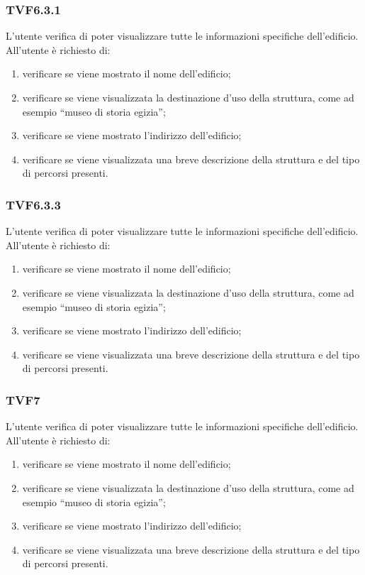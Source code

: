 		\subsubsection{TVF6.3.1}
			L'utente verifica di poter visualizzare tutte le informazioni specifiche dell'edificio.
			All'utente è richiesto di:
			\begin{enumerate}
				\item verificare se viene mostrato il nome dell'edificio;
				\item verificare se viene visualizzata la destinazione d'uso della struttura, come ad esempio ``museo di storia egizia'';
				\item verificare se viene mostrato l'indirizzo dell'edificio;
				\item verificare se viene visualizzata una breve descrizione della struttura e del tipo di percorsi presenti.
			\end{enumerate}
		\subsubsection{TVF6.3.3} %
			L'utente verifica di poter visualizzare tutte le informazioni specifiche dell'edificio.
			All'utente è richiesto di:
			\begin{enumerate}
				\item verificare se viene mostrato il nome dell'edificio;
				\item verificare se viene visualizzata la destinazione d'uso della struttura, come ad esempio ``museo di storia egizia'';
				\item verificare se viene mostrato l'indirizzo dell'edificio;
				\item verificare se viene visualizzata una breve descrizione della struttura e del tipo di percorsi presenti.
			\end{enumerate}
		\subsubsection{TVF7} %
			L'utente verifica di poter visualizzare tutte le informazioni specifiche dell'edificio.
			All'utente è richiesto di:
			\begin{enumerate}
				\item verificare se viene mostrato il nome dell'edificio;
				\item verificare se viene visualizzata la destinazione d'uso della struttura, come ad esempio ``museo di storia egizia'';
				\item verificare se viene mostrato l'indirizzo dell'edificio;
				\item verificare se viene visualizzata una breve descrizione della struttura e del tipo di percorsi presenti.
			\end{enumerate}
